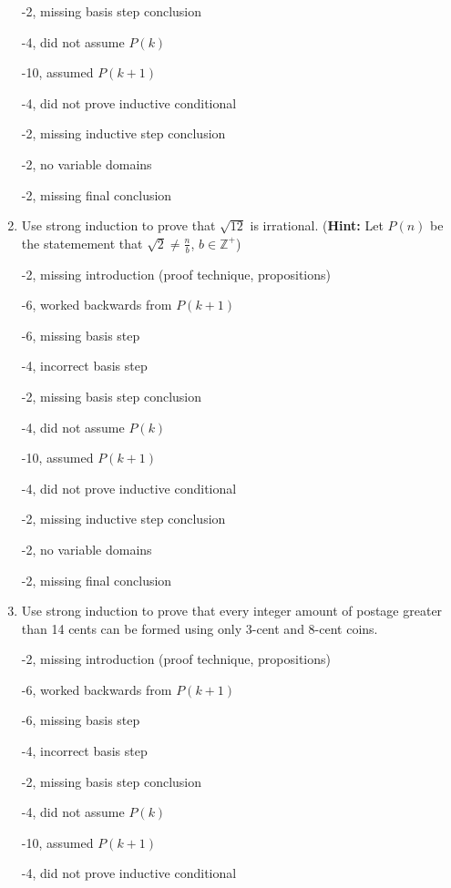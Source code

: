 \begin{enumerate}
\begin{rubric}
-2, missing basis step conclusion

-4, did not assume $P(k)$

-10, assumed $P(k+1)$

-4, did not prove inductive conditional

-2, missing inductive step conclusion

-2, no variable domains

-2, missing final conclusion
\end{rubric}

\item Use strong induction to prove that $\sqrt{12}$ is irrational. (\textbf{Hint:} Let $P(n)$ be the statemement that $\sqrt{2} \neq \frac{n}{b}$, $b \in \mathbb{Z}^+$) 

\begin{rubric}
-2, missing introduction (proof technique, propositions)

-6, worked backwards from $P(k+1)$

-6, missing basis step

-4, incorrect basis step

-2, missing basis step conclusion

-4, did not assume $P(k)$

-10, assumed $P(k+1)$

-4, did not prove inductive conditional

-2, missing inductive step conclusion

-2, no variable domains

-2, missing final conclusion
\end{rubric}

\item Use strong induction to prove that every integer amount of postage greater than 14 cents can be formed using only 3-cent and 8-cent coins. 

\begin{rubric}
-2, missing introduction (proof technique, propositions)

-6, worked backwards from $P(k+1)$

-6, missing basis step

-4, incorrect basis step

-2, missing basis step conclusion

-4, did not assume $P(k)$

-10, assumed $P(k+1)$

-4, did not prove inductive conditional


\end{rubric}
\end{enumerate}

